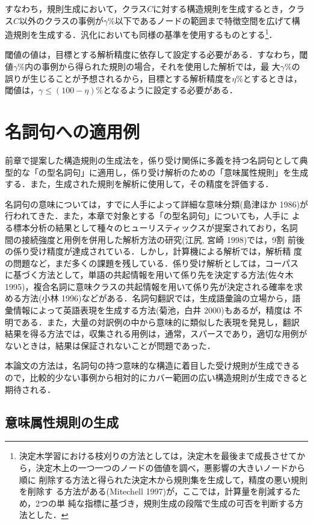 すなわち，規則生成において，クラス$C$に対する構造規則を生成するとき，クラ
ス$C$以外のクラスの事例が$\gamma \%$以下であるノードの範囲まで特徴空間を広げて構
造規則を生成する．汎化においても同様の基準を使用するものとする\footnote
{決定木学習における枝刈りの方法としては，決定木を最後まで成長させてか
ら，決定木上の一つ一つのノードの価値を調べ，悪影響の大きいノードから順に
削除する方法と得られた決定木から規則集を生成して，精度の悪い規則を削除す
る方法がある(Mitechell 1997)が，ここでは，計算量を削減するため，2つの単
純な指標に基づき，規則生成の段階で生成の可否を判断する方法とした．}．

閾値の値は，目標とする解析精度に依存して設定する必要がある．すなわち，閾
値$\gamma \%$内の事例から得られた規則の場合，それを使用した解析では，最
大$\gamma \%$の
誤りが生じることが予想されるから，目標とする解析精度を$\eta \%$とするときは，
閾値は，$\gamma\leq (100-\eta)\%$となるように設定する必要がある．
\section{名詞句への適用例}
前章で提案した構造規則の生成法を，係り受け関係に多義を持つ名詞句として典
型的な「の型名詞句」に適用し，係り受け解析のための「意味属性規則」を生成
する．また，生成された規則を解析に使用して，その精度を評価する．

名詞句の意味については，すでに人手によって詳細な意味分類(島津ほか
 1986)が行われてきた．また，本章で対象とする「の型名詞句」についても，人手に
よる標本分析の結果として種々のヒューリスティックスが提案されており，名詞
間の接続強度と用例を併用した解析方法の研究(江尻, 宮崎 1998)では，9割
前後の係り受け精度が達成されている．しかし，計算機による解析では，解析精
度の問題など，まだ多くの課題を残している．係り受け解析としては，コーパス
に基づく方法として，単語の共起情報を用いて係り先を決定する方法(佐々木
1995)，複合名詞に意味クラスの共起情報を用いて係り先が決定される確率を求
める方法(小林 1996)などがある．名詞句翻訳では，生成語彙論の立場から，語
彙情報によって英語表現を生成する方法(菊池，白井 2000)もあるが，精度は
不明である．また，大量の対訳例の中から意味的に類似した表現を発見し，翻訳
結果を得る方法では，収集される用例は，通常，スパースであり，適切な用例が
ないときは，結果は保証されないことが問題であった．

本論文の方法は，名詞句の持つ意味的な構造に着目した受け規則が生成できる
ので，比較的少ない事例から相対的にカバー範囲の広い構造規則が生成できると
期待される．
\subsection{意味属性規則の生成}

